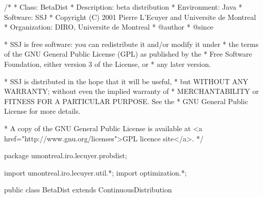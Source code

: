 \begin{code}
\begin{hide}
/*
 * Class:        BetaDist
 * Description:  beta distribution
 * Environment:  Java
 * Software:     SSJ
 * Copyright (C) 2001  Pierre L'Ecuyer and Universite de Montreal
 * Organization: DIRO, Universite de Montreal
 * @author
 * @since

 * SSJ is free software: you can redistribute it and/or modify it under
 * the terms of the GNU General Public License (GPL) as published by the
 * Free Software Foundation, either version 3 of the License, or
 * any later version.

 * SSJ is distributed in the hope that it will be useful,
 * but WITHOUT ANY WARRANTY; without even the implied warranty of
 * MERCHANTABILITY or FITNESS FOR A PARTICULAR PURPOSE.  See the
 * GNU General Public License for more details.

 * A copy of the GNU General Public License is available at
   <a href="http://www.gnu.org/licenses">GPL licence site</a>.
 */
\end{hide}
package  umontreal.iro.lecuyer.probdist;
\begin{hide}
import umontreal.iro.lecuyer.util.*;
import optimization.*;
\end{hide}

public class BetaDist extends ContinuousDistribution\begin{hide} {
   protected double alpha;         // First parameter
   protected double beta;          // Second parameter
   protected double a, b;          // Interval x in [a, b]
   protected double bminusa;
   protected double logFactor;
   protected double Beta;          // Function Beta(alpha, beta)
   protected double logBeta;       // Ln(Beta(alpha, beta))

   private static class Optim implements Lmder_fcn
   {
      private double a;
      private double b;

      public Optim (double a, double b)
      {
         this.a = a;
         this.b = b;
      }

      public void fcn (int m, int n, double[] x, double[] fvec, double[][] fjac, int iflag[])
      {
         if (x[1] <= 0.0 || x[2] <= 0.0) {
             final double BIG = 1.0e100;
             fvec[1] = BIG;
             fvec[2] = BIG;
             fjac[1][1] = BIG;
             fjac[1][2] = 0.0;
             fjac[2][1] = 0.0;
             fjac[2][2] = BIG;
             return;
         }

         double trig;
         if (iflag[1] == 1)
         {
            trig = Num.digamma (x[1] + x[2]);
            fvec[1] = Num.digamma(x[1]) - trig - a;
            fvec[2] = Num.digamma(x[2]) - trig - b;
         }
         else if (iflag[1] == 2)
         {
            trig = Num.trigamma (x[1] + x[2]);

            fjac[1][1] = Num.trigamma (x[1]) - trig;
            fjac[1][2] = - trig;
            fjac[2][1] = - trig;
            fjac[2][2] = Num.trigamma (x[2]) - trig;
         }
      }
   }
\end{hide}\end{code}


